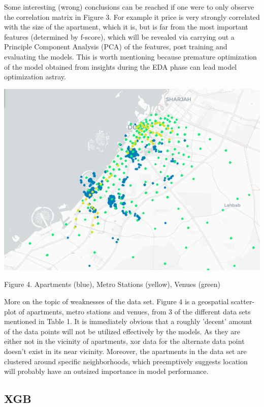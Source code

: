 \documentclass[conference]{IEEEtran}
\begin{document}
Some interesting (wrong) conclusions can be reached if one were to only observe the correlation matrix in Figure 3. For example it price is very strongly correlated with the size of the apartment, which it is, but is far from the most important features (determined by f-score), which will be revealed via carrying out a Principle Component Analysis (PCA) of the features, post training and evaluating the models. This is worth mentioning because premature optimization of the model obtained from insights during the EDA phase can lead model optimization astray. 

\smallbreak
\smallbreak
\smallbreak
\includegraphics[scale = 0.5]{images/locations_dataviz.png}
\smallbreak
\caption {Figure 4. Apartments (blue), Metro Stations (yellow), Venues (green)}
\smallbreak
\smallbreak
\smallbreak

More on the topic of weaknesses of the data set. Figure 4 is a geospatial scatter-plot of apartments, metro stations and venues, from 3 of the different data sets mentioned in Table 1. It is immediately obvious that a roughly 'decent' amount of the data points will not be utilized effectively by the models. As they are either not in the vicinity of apartments, xor data for the alternate data point doesn't exist in its near vicinity. Moreover, the apartments in the data set are clustered around specific neighborhoods, which preemptively suggests location will probably have an outsized importance in model performance.  


\subsection{XGB}
\end{document}
